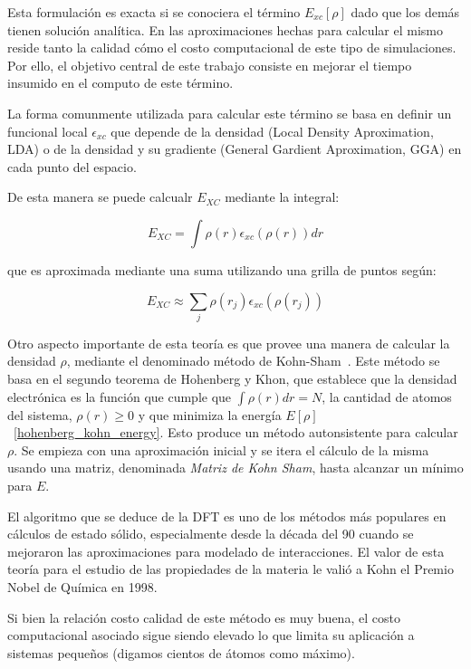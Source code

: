 Esta formulación es exacta si se conociera el término $E_{xc}[\rho]$ dado que los demás tienen solución analítica. En las aproximaciones hechas para calcular el mismo reside tanto la calidad cómo el costo 
computacional de este tipo de simulaciones. Por ello, el objetivo central de este trabajo consiste en mejorar el tiempo insumido en el computo de este término.

La forma comunmente utilizada para calcular este término se basa en definir un funcional local $\epsilon_{xc}$ que depende de la densidad (Local Density Aproximation, LDA) o de la densidad y su gradiente 
(General Gardient Aproximation, GGA) en cada punto del espacio.

De esta manera se puede calcualr $ E_{XC} $ mediante la integral:

\begin{equation}
    E_{XC} = \int \rho(r) \epsilon_{xc}\left( \rho(r) \right ) dr
\end{equation}

que es aproximada mediante una suma utilizando una grilla de puntos según:

\begin{equation}
    \label{approx_excenergy}
    E_{XC} \approx \sum_j \rho(r_j) \epsilon_{xc} (\rho(r_j))
\end{equation}

Otro aspecto importante de esta teor\'ia es que provee una manera de calcular la densidad $\rho$,
mediante el denominado m\'etodo de Kohn-Sham~\cite{KohnSham}. Este m\'etodo se basa en el segundo teorema
de Hohenberg y Khon, que establece que la densidad electr\'onica es la funci\'on que
cumple que $\int \rho(r) dr = N$, la cantidad de atomos del sistema, $\rho(r) \geq 0$ y que
minimiza la energ\'ia $E[\rho]$~\ref{hohenberg_kohn_energy}. Esto produce
un m\'etodo autonsistente para calcular $\rho$. Se empieza con una aproximaci\'on inicial y
se itera el c\'alculo de la misma usando una matriz, denominada \textit{Matriz de Kohn Sham}, hasta
alcanzar un m\'inimo para $E$.

El algoritmo que se deduce de la DFT es uno de los m\'etodos m\'as populares en c\'alculos
de estado s\'olido, especialmente desde la d\'ecada del 90 cuando se mejoraron las aproximaciones para modelado de
interacciones. El valor de esta teor\'ia para el estudio de las propiedades de la materia le vali\'o a Kohn el Premio Nobel
de Qu\'imica en 1998.

Si bien la relaci\'on costo calidad de este m\'etodo es muy buena, el costo computacional asociado sigue siendo elevado lo que limita su aplicación a sistemas pequeños (digamos cientos de átomos como máximo).


